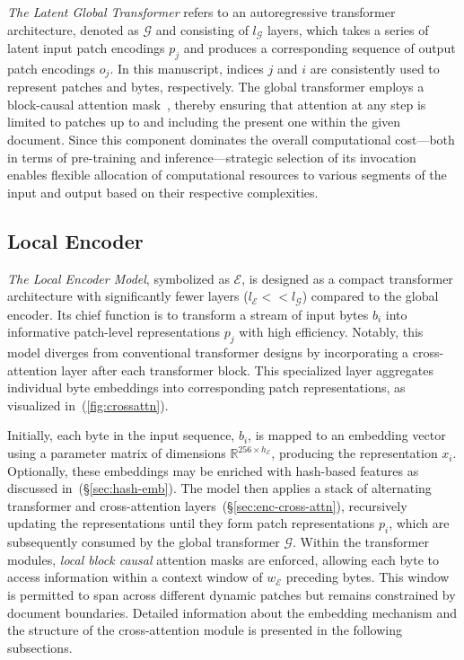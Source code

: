 \textit{The Latent Global Transformer} refers to an autoregressive transformer architecture, denoted as $\mathcal{G}$ and consisting of $l_{\mathcal{G}}$ layers, which takes a series of latent input patch encodings $p_j$ and produces a corresponding sequence of output patch encodings $o_j$. In this manuscript, indices $j$ and $i$ are consistently used to represent patches and bytes, respectively. The global transformer employs a block-causal attention mask~\citep{dubey2024llama}, thereby ensuring that attention at any step is limited to patches up to and including the present one within the given document. Since this component dominates the overall computational cost—both in terms of pre-training and inference—strategic selection of its invocation enables flexible allocation of computational resources to various segments of the input and output based on their respective complexities.

\subsection{Local Encoder}
\label{section:local}

\textit{The Local Encoder Model}, symbolized as $\mathcal{E}$, is designed as a compact transformer architecture with significantly fewer layers ($l_{\mathcal{E}} << l_{\mathcal{G}}$) compared to the global encoder. Its chief function is to transform a stream of input bytes $b_i$ into informative patch-level representations $p_j$ with high efficiency. Notably, this model diverges from conventional transformer designs by incorporating a cross-attention layer after each transformer block. This specialized layer aggregates individual byte embeddings into corresponding patch representations, as visualized in~(\autoref{fig:crossattn}).

Initially, each byte in the input sequence, $b_i$, is mapped to an embedding vector using a parameter matrix of dimensions $\mathbb{R}^{256 \times h_{\mathcal{E}}}$, producing the representation $x_i$. Optionally, these embeddings may be enriched with hash-based features as discussed in~(\S\ref{sec:hash-emb}). The model then applies a stack of alternating transformer and cross-attention layers~(\S\ref{sec:enc-cross-attn}), recursively updating the representations until they form patch representations $p_i$, which are subsequently consumed by the global transformer $\mathcal{G}$. Within the transformer modules, \textit{local block causal} attention masks are enforced, allowing each byte to access information within a context window of $w_{\mathcal{E}}$ preceding bytes. This window is permitted to span across different dynamic patches but remains constrained by document boundaries. Detailed information about the embedding mechanism and the structure of the cross-attention module is presented in the following subsections.

